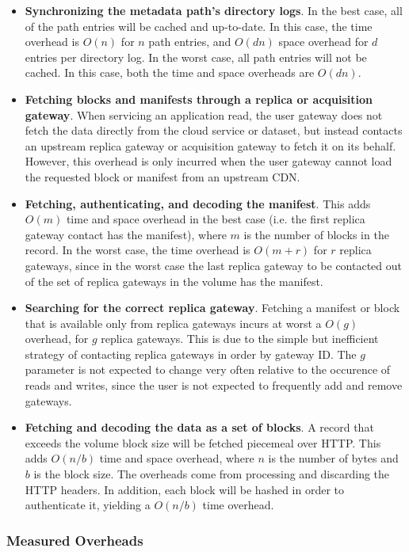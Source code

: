 \begin{itemize}
\item \textbf{Synchronizing the metadata path's directory logs}.
In the best case, all of the path entries will be cached and up-to-date.  In
this case, the time overhead is $O(n)$ for $n$ path entries, and $O(dn)$ space
overhead for $d$ entries per directory log.  In the worst case,
all path entries will not be cached.  In this case, both the time and space
overheads are $O(dn)$.
\item \textbf{Fetching blocks and manifests through a replica or acquisition gateway}.  When
servicing an application read, the user gateway does not fetch the data directly
from the cloud service or dataset, but instead contacts an upstream replica
gateway or acquisition gateway to
fetch it on its behalf.  However, this overhead is only
incurred when the user gateway cannot load the requested block or manifest from
an upstream CDN.
\item \textbf{Fetching, authenticating, and decoding the manifest}.
This adds $O(m)$ time and space overhead in the best case (i.e. the first
replica gateway contact has the manifest),
where $m$ is the number of blocks in the record.  In the worst case, the time overhead is
$O(m+r)$ for $r$ replica gateways, since in the worst case the last replica
gateway to be contacted out of the set of replica gateways in the volume
has the manifest.
\item \textbf{Searching for the correct replica gateway}.  Fetching a manifest
or block that is available only from replica gateways incurs at worst a $O(g)$
overhead, for $g$ replica gateways.  This is due to the simple but inefficient
strategy of contacting replica gateways in order by gateway ID.  The $g$
parameter is not expected to change very often relative to the occurence of reads and
writes, since the user is not expected to frequently add and remove gateways.
\item \textbf{Fetching and decoding the data as a set of blocks}.  A record that exceeds the
volume block size will be fetched piecemeal over HTTP.  This adds $O(n/b)$ time
and space overhead, where $n$ is the number of bytes and $b$ is the block size.
The overheads come from processing and discarding the HTTP headers.  In
addition, each block will be hashed in order to authenticate it,
yielding a $O(n/b)$ time overhead.
\end{itemize}

\subsubsection{Measured Overheads}

